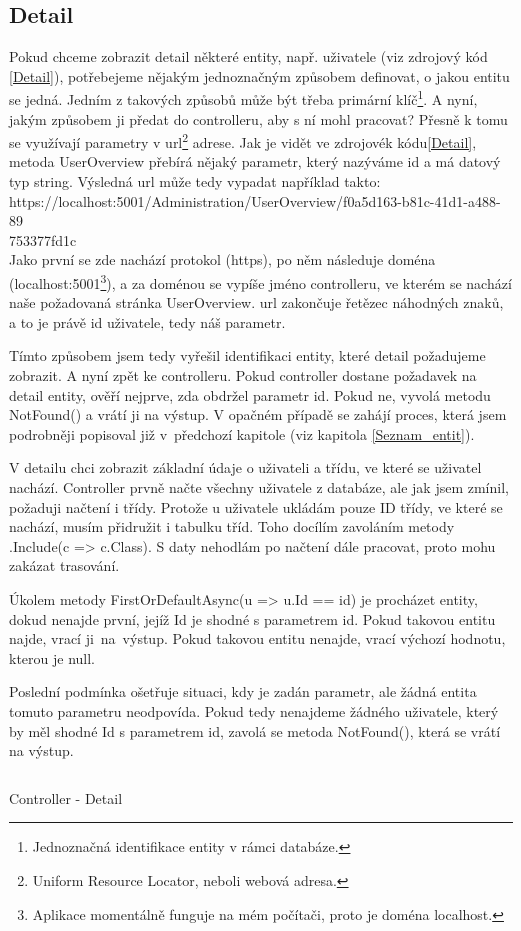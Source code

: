\documentclass[a4paper, 12pt]{report}
\begin{document}
	\subsection{Detail} \label{Deail}
	Pokud chceme zobrazit detail některé entity, např. uživatele (viz zdrojový kód \ref{Detail}), potřebejeme nějakým jednoznačným způsobem definovat, o jakou entitu se jedná. Jedním z takových způsobů může být třeba primární klíč\footnote{Jednoznačná identifikace entity v rámci databáze.}. A nyní, jakým způsobem ji předat do controlleru, aby s ní mohl pracovat? Přesně k tomu se využívají parametry v url\footnote{Uniform Resource Locator, neboli webová adresa.} adrese. Jak je vidět ve zdrojovék kódu\ref{Detail}, metoda UserOverview přebírá nějaký parametr, který nazýváme id a má datový typ string. Výsledná url může tedy vypadat například takto: \\
	https://localhost:5001/Administration/UserOverview/f0a5d163-b81c-41d1-a488-89\\753377fd1c\\
	Jako první se zde nachází protokol (https), po něm následuje doména (localhost:5001\footnote{Aplikace momentálně funguje na mém počítači, proto je doména localhost.}), a za doménou se vypíše jméno controlleru, ve kterém se nachází naše požadovaná stránka UserOverview. url zakončuje řetězec náhodných znaků, a to je právě id uživatele, tedy náš parametr.\par
	Tímto způsobem jsem tedy vyřešil identifikaci entity, které detail požadujeme zobrazit. A nyní zpět ke controlleru. Pokud controller dostane požadavek na detail entity, ověří nejprve, zda obdržel parametr id. Pokud ne, vyvolá metodu NotFound() a vrátí ji na výstup. V opačném případě se zahájí proces, která jsem podrobněji popisoval již v~předchozí kapitole (viz kapitola \ref{Seznam_entit}).\par
	V detailu chci zobrazit základní údaje o uživateli a třídu, ve které se uživatel nachází. Controller prvně načte všechny uživatele z databáze, ale jak jsem zmínil, požaduji načtení i třídy. Protože u uživatele ukládám pouze ID třídy, ve které se nachází, musím přidružit i tabulku tříd. Toho docílím zavoláním metody .Include(c => c.Class). S daty nehodlám po načtení dále pracovat, proto mohu zakázat trasování.\par
	Úkolem metody FirstOrDefaultAsync(u => u.Id == id) je procházet entity, dokud nenajde první, jejíž Id je shodné s parametrem id. Pokud takovou entitu najde, vrací ji~na~výstup. Pokud takovou entitu nenajde, vrací výchozí hodnotu, kterou je null.\par
	Poslední podmínka ošetřuje situaci, kdy je zadán parametr, ale žádná entita tomuto parametru neodpovída. Pokud tedy nenajdeme žádného uživatele, který by měl shodné Id s parametrem id, zavolá se metoda NotFound(), která se vrátí na výstup.
	\begin{listing}[H]
		\inputminted{csharp}{SourceCode/Controllers/Detail.cs}
		\caption{Controller - Detail}
		\label{Detail}
	\end{listing}
\end{document}
